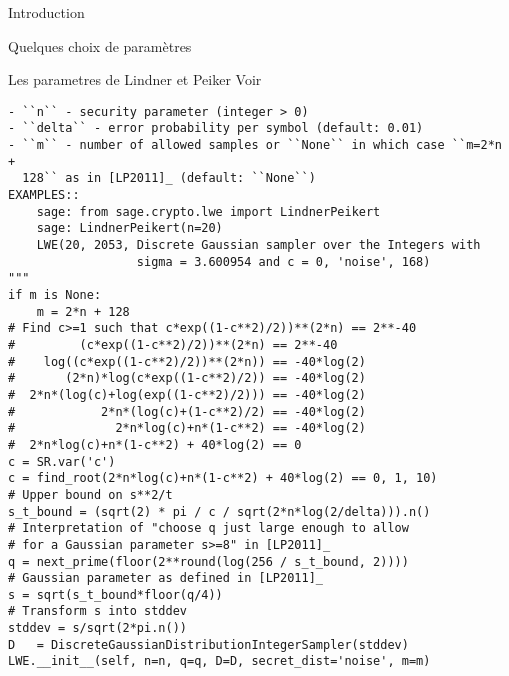 \begin{section}{Introduction}
\begin{subsection}{Quelques choix de paramètres}
\begin{subsubsection}{Les parametres de Lindner et Peiker}
Voir \cite{LinPei10a}
\begin{lstlisting}
- ``n`` - security parameter (integer > 0)
- ``delta`` - error probability per symbol (default: 0.01)
- ``m`` - number of allowed samples or ``None`` in which case ``m=2*n +
  128`` as in [LP2011]_ (default: ``None``)
EXAMPLES::
    sage: from sage.crypto.lwe import LindnerPeikert
    sage: LindnerPeikert(n=20)
    LWE(20, 2053, Discrete Gaussian sampler over the Integers with 
                  sigma = 3.600954 and c = 0, 'noise', 168)
"""
if m is None:
    m = 2*n + 128
# Find c>=1 such that c*exp((1-c**2)/2))**(2*n) == 2**-40
#         (c*exp((1-c**2)/2))**(2*n) == 2**-40
#    log((c*exp((1-c**2)/2))**(2*n)) == -40*log(2)
#       (2*n)*log(c*exp((1-c**2)/2)) == -40*log(2)
#  2*n*(log(c)+log(exp((1-c**2)/2))) == -40*log(2)
#            2*n*(log(c)+(1-c**2)/2) == -40*log(2)
#              2*n*log(c)+n*(1-c**2) == -40*log(2)
#  2*n*log(c)+n*(1-c**2) + 40*log(2) == 0
c = SR.var('c')
c = find_root(2*n*log(c)+n*(1-c**2) + 40*log(2) == 0, 1, 10)
# Upper bound on s**2/t
s_t_bound = (sqrt(2) * pi / c / sqrt(2*n*log(2/delta))).n()
# Interpretation of "choose q just large enough to allow 
# for a Gaussian parameter s>=8" in [LP2011]_
q = next_prime(floor(2**round(log(256 / s_t_bound, 2))))
# Gaussian parameter as defined in [LP2011]_
s = sqrt(s_t_bound*floor(q/4))
# Transform s into stddev
stddev = s/sqrt(2*pi.n())
D   = DiscreteGaussianDistributionIntegerSampler(stddev)
LWE.__init__(self, n=n, q=q, D=D, secret_dist='noise', m=m)
\end{lstlisting}
\end{subsubsection}

\end{subsection}
\end{section}
